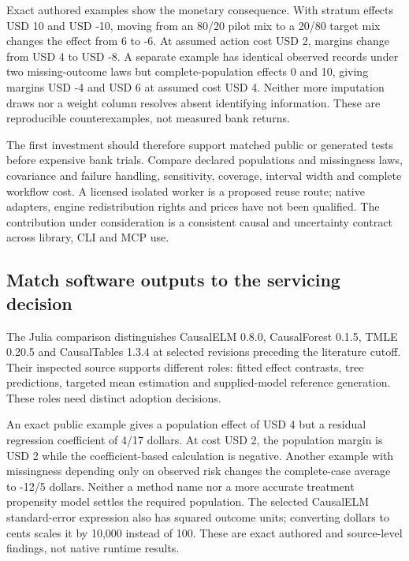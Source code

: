 Exact authored examples show the monetary consequence. With stratum
effects USD 10 and USD -10, moving from an 80/20 pilot mix to a 20/80
target mix changes the effect from 6 to -6. At assumed action cost USD
2, margins change from USD 4 to USD -8. A separate example has identical
observed records under two missing-outcome laws but complete-population
effects 0 and 10, giving margins USD -4 and USD 6 at assumed cost USD 4.
Neither more imputation draws nor a weight column resolves absent
identifying information. These are reproducible counterexamples, not
measured bank returns. \citep{exec21_transport_reference}

The first investment should therefore support matched public or
generated tests before expensive bank trials. Compare declared
populations and missingness laws, covariance and failure handling,
sensitivity, coverage, interval width and complete workflow cost. A
licensed isolated worker is a proposed reuse route; native adapters,
engine redistribution rights and prices have not been qualified. The
contribution under consideration is a consistent causal and uncertainty
contract across library, CLI and MCP use.

\hypertarget{match-software-outputs-to-the-servicing-decision}{%
\subsection{Match software outputs to the servicing
decision}\label{match-software-outputs-to-the-servicing-decision}}

The Julia comparison distinguishes CausalELM 0.8.0, CausalForest 0.1.5,
TMLE 0.20.5 and CausalTables 1.3.4 at selected revisions preceding the
literature cutoff. Their inspected source supports different roles:
fitted effect contrasts, tree predictions, targeted mean estimation and
supplied-model reference generation. These roles need distinct adoption
decisions.
\cite{exec21_effects_causalelm,exec21_effects_causalforest,exec21_effects_tmle,exec21_effects_causaltables}

An exact public example gives a population effect of USD 4 but a
residual regression coefficient of 4/17 dollars. At cost USD 2, the
population margin is USD 2 while the coefficient-based calculation is
negative. Another example with missingness depending only on observed
risk changes the complete-case average to -12/5 dollars. Neither a
method name nor a more accurate treatment propensity model settles the
required population. The selected CausalELM standard-error expression
also has squared outcome units; converting dollars to cents scales it by
10,000 instead of 100. These are exact authored and source-level
findings, not native runtime results. \cite{exec21_effects_reference}

